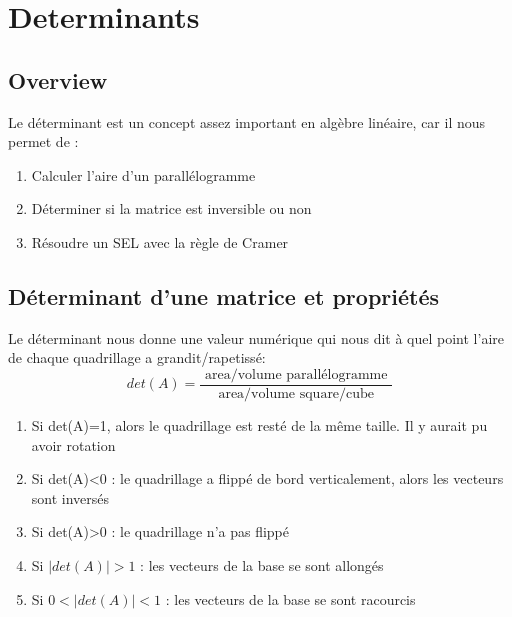 \documentclass{article}
\begin{document}
\section{Determinants}

\subsection{Overview}%
\label{sub:Overview}

Le déterminant est un concept assez important en algèbre linéaire, car il
nous permet de :
\begin{enumerate}
    \item Calculer l'aire d'un parallélogramme
    \item Déterminer si la matrice est inversible ou non
    \item Résoudre un SEL avec la règle de Cramer
\end{enumerate}

\subsection{Déterminant d'une matrice et propriétés}%
\label{sub:Déterminant d'une matrice et propriétés}

\begin{definition}
\end{definition}

\begin{intuition}
    Le déterminant nous donne une valeur numérique qui nous dit
    à quel point l'aire de chaque quadrillage a grandit/rapetissé:
    $$ det(A) = \frac{\text { area/volume parallélogramme }}
    { \text{ area/volume square/cube } }  $$
    \begin{enumerate}
	\item Si det(A)=1, alors le quadrillage est resté de la même taille.
	    Il y aurait pu avoir rotation
	\item Si det(A)<0 : le quadrillage a flippé de bord verticalement,
	    alors les vecteurs sont inversés
	\item Si det(A)>0 : le quadrillage n'a pas flippé
	\item Si $ |det(A)| > 1$ : les vecteurs de la base se sont allongés
	\item Si $ 0< |det(A)| < 1$ : les vecteurs de la base se sont
	    racourcis
    \end{enumerate}
\end{intuition}
\end{document}
